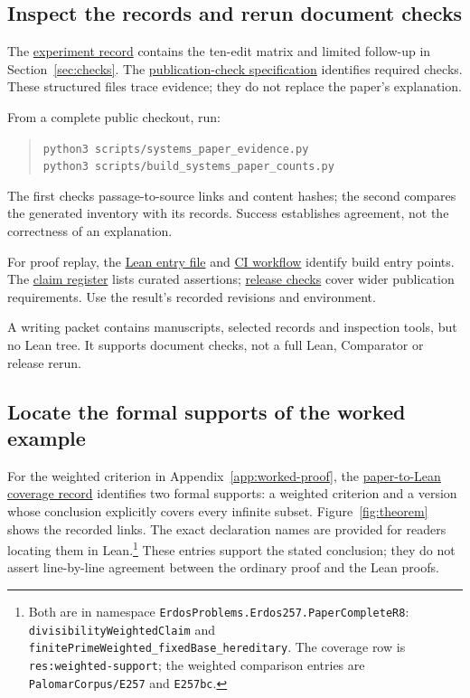 \documentclass[10pt]{article}
\newcommand{\repobase}{https://github.com/wcook04/plectis-erdos}
\newcommand{\reporef}[2]{\href{\repobase/blob/992cf60a27efd8c34f437e347c413bb781d75c32/#1}{#2}}
\begin{document}
\subsection{Inspect the records and rerun document checks}

The \reporef{docs/publication_evidence.json}{experiment record} contains the ten-edit matrix and limited follow-up in Section~\ref{sec:checks}. The \reporef{docs/publication_contract.json}{publication-check specification} identifies required checks. These structured files trace evidence; they do not replace the paper's explanation.

From a complete public checkout, run:
\begin{quote}\small
\texttt{python3 scripts/systems\_paper\_evidence.py}\\
\texttt{python3 scripts/build\_systems\_paper\_counts.py}
\end{quote}
The first checks passage-to-source links and content hashes; the second compares the generated inventory with its records. Success establishes agreement, not the correctness of an explanation.

For proof replay, the \reporef{lean/Erdos249257.lean}{Lean entry file} and \reporef{.github/workflows/lean.yml}{CI workflow} identify build entry points. The \reporef{docs/claims.json}{claim register} lists curated assertions; \reporef{scripts/check_release.py}{release checks} cover wider publication requirements. Use the result's recorded revisions and environment.

A writing packet contains manuscripts, selected records and inspection tools, but no Lean tree. It supports document checks, not a full Lean, Comparator or release rerun.

\subsection{Locate the formal supports of the worked example}

For the weighted criterion in Appendix~\ref{app:worked-proof}, the \reporef{docs/paper_lean_coverage.json}{paper-to-Lean coverage record} identifies two formal supports: a weighted criterion and a version whose conclusion explicitly covers every infinite subset. Figure~\ref{fig:theorem} shows the recorded links. The exact declaration names are provided for readers locating them in Lean.\footnote{Both are in namespace \nolinkurl{ErdosProblems.Erdos257.PaperCompleteR8}: \nolinkurl{divisibilityWeightedClaim} and \nolinkurl{finitePrimeWeighted_fixedBase_hereditary}. The coverage row is \texttt{res:weighted-support}; the weighted comparison entries are \texttt{PalomarCorpus/E257} and \texttt{E257bc}.} These entries support the stated conclusion; they do not assert line-by-line agreement between the ordinary proof and the Lean proofs.
\end{document}
